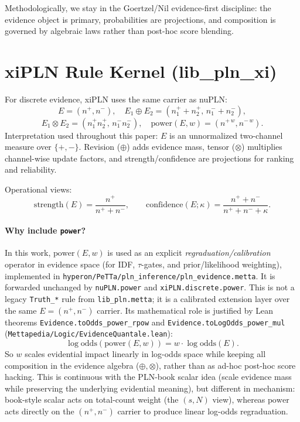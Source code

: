 \documentclass[11pt]{article}
\newcommand{\lpath}[1]{\texttt{\nolinkurl{#1}}}
\newcommand{\lid}[1]{{\ttfamily\nolinkurl{#1}}}
\begin{document}
\noindent
Methodologically, we stay in the Goertzel/Nil evidence-first discipline:
the evidence object is primary, probabilities are projections, and composition is
governed by algebraic laws rather than post-hoc score blending.

\section{xiPLN Rule Kernel (lib\_pln\_xi)}
For discrete evidence, xiPLN uses the same carrier as nuPLN:
\[
E=(n^+,n^-),\quad E_1\oplus E_2=(n_1^+ + n_2^+,\, n_1^- + n_2^-),
\]
\[
E_1\otimes E_2=(n_1^+ n_2^+,\, n_1^- n_2^-),\quad
\mathrm{power}(E,w)=(n^{+\,w},n^{-\,w}).
\]
Interpretation used throughout this paper: \(E\) is an unnormalized two-channel
measure over \(\{+,-\}\). Revision (\(\oplus\)) adds evidence mass, tensor
(\(\otimes\)) multiplies channel-wise update factors, and strength/confidence are
projections for ranking and reliability.

Operational views:
\[
\mathrm{strength}(E)=\frac{n^+}{n^+ + n^-},\qquad
\mathrm{confidence}(E;\kappa)=\frac{n^+ + n^-}{n^+ + n^- + \kappa}.
\]
\paragraph{Why include \texorpdfstring{\lid{power}}{power}?}
In this work, \(\mathrm{power}(E,w)\) is used as an explicit
\emph{regraduation/calibration} operator in evidence space
(for IDF, \(\tau\)-gates, and prior/likelihood weighting),
implemented in \lpath{hyperon/PeTTa/pln_inference/pln_evidence.metta}.
It is forwarded unchanged by \lid{nuPLN.power} and
\lid{xiPLN.discrete.power}. This is not a legacy
\lid{Truth_*} rule from \lpath{lib_pln.metta}; it is a calibrated extension
layer over the same \(E=(n^+,n^-)\) carrier.
Its mathematical role is justified by Lean theorems
\lid{Evidence.toOdds_power_rpow} and \lid{Evidence.toLogOdds_power_mul}
(\lpath{Mettapedia/Logic/EvidenceQuantale.lean}):
\[
\log\mathrm{odds}(\mathrm{power}(E,w)) = w\cdot \log\mathrm{odds}(E).
\]
So \(w\) scales evidential impact linearly in log-odds space while keeping all
composition in the evidence algebra (\(\oplus,\otimes\)), rather than as ad-hoc
post-hoc score hacking.
This is continuous with the PLN-book scalar idea (scale evidence mass while
preserving the underlying evidential meaning), but different in mechanism:
book-style scalar acts on total-count weight (the \((s,N)\) view), whereas
\(\mathrm{power}\) acts directly on the \((n^+,n^-)\) carrier to produce linear
log-odds regraduation.
\end{document}
